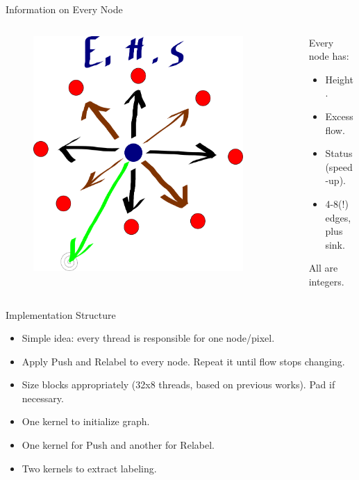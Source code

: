 \documentclass{beamer}
\begin{document}
\begin{frame}{Information on Every Node}
	\begin{columns}
	\begin{column}{5cm}
		\begin{figure}
		\includegraphics[width=0.9\textwidth]{drawing} 
		\end{figure}
	\end{column}
	\begin{column}{5cm}
	  Every node has:
	  \begin{itemize}
	    \item
	    Height.
	    \item
	    Excess flow.
	    \item
	    Status (speed-up).
	    \item
	    4-8(!) edges, plus sink.
	  \end{itemize}
	  All are integers.
	\end{column}
	\end{columns}
\end{frame}

\begin{frame}{Implementation Structure}
\begin{itemize}
 \item
 Simple idea: every thread is responsible for one node/pixel.
 \item
 Apply Push and Relabel to every node. Repeat it until flow stops changing.
 \item
 Size blocks appropriately (32x8 threads, based on previous works). Pad if necessary.
 \item
 One kernel to initialize graph.
 \item
 One kernel for Push and another for Relabel.
 \item
 Two kernels to extract labeling.
\end{itemize}
\end{frame}
\end{document}
